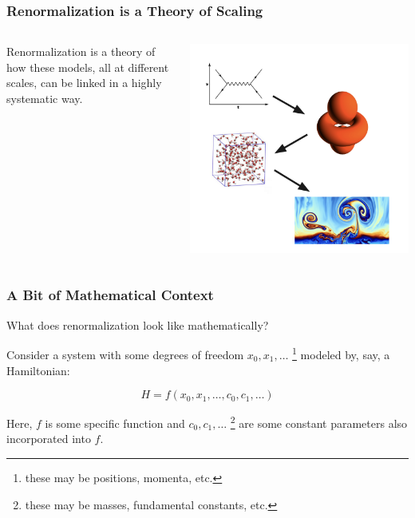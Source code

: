 \documentclass[aspectratio=169, 12pt]{beamer}
\begin{document}
\begin{frame}
    \frametitle{Renormalization is a Theory of Scaling}

    \begin{columns}
        
    \begin{column}{.6\textwidth}

        Renormalization is a theory of how these models, all at different scales, can be linked in a highly systematic way. 

    \end{column}
    \begin{column}{.4\textwidth}
        \includegraphics[width=\textwidth]{images/theory-flow.png}
    \end{column}
    \end{columns}
    
\end{frame}

\begin{frame}
    \frametitle{A Bit of Mathematical Context}
    
    What does renormalization look like mathematically?

    \vspace{1em}
    
    Consider a system with some degrees of freedom $x_0, x_1, \dots$ \footnote{these may be positions, momenta, etc.} modeled by, say, a Hamiltonian:
    
    \[H = f(x_0, x_1, \dots, c_0, c_1, \dots)\]
    
    Here, $f$ is some specific function and $c_0, c_1, \dots$ \footnote{these may be masses, fundamental constants, etc.} are some constant parameters also incorporated into $f$. 

\end{frame}
\end{document}
